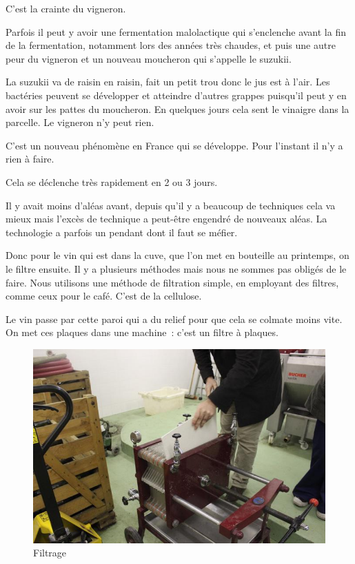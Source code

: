 \documentclass[a4paper, titlepage]{report}
\begin{document}
C'est la crainte du vigneron.

Parfois il peut y avoir une fermentation malolactique qui s'enclenche
avant la fin de la fermentation, notamment lors des années très chaudes,
et puis une autre peur du vigneron et un nouveau moucheron qui s'appelle
le suzukii.

La suzukii va de raisin en raisin, fait un petit trou donc le jus est à
l'air. Les bactéries peuvent se développer et atteindre d'autres grappes
puisqu'il peut y en avoir sur les pattes du moucheron. En quelques jours
cela sent le vinaigre dans la parcelle. Le vigneron n'y peut rien.

C'est un nouveau phénomène en France qui se développe. Pour l'instant il
n'y a rien à faire.

Cela se déclenche très rapidement en 2 ou 3 jours.

Il y avait moins d'aléas avant, depuis qu'il y a beaucoup de techniques
cela va mieux mais l'excès de technique a peut-être engendré de nouveaux
aléas. La technologie a parfois un pendant dont il faut se méfier.

Donc pour le vin qui est dans la cuve, que l'on met en bouteille au
printemps, on le filtre ensuite. Il y a plusieurs méthodes mais nous ne
sommes pas obligés de le faire. Nous utilisons une méthode de filtration
simple, en employant des filtres, comme ceux pour le café. C'est de la
cellulose.

Le vin passe par cette paroi qui a du relief pour que cela se colmate
moins vite. On met ces plaques dans une machine~: c'est un filtre à
plaques.

\begin{figure}[!h]
\includegraphics{Images/filtre.jpg}
\caption{Filtrage}
\end{figure}
\end{document}
